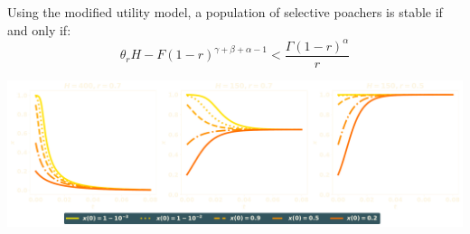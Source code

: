 \documentclass{beamer}
\begin{document}
\begin{frame}
    \centering
    \footnotesize
    \begin{theorem}[Disincentive]
    Using the modified utility model, a population of selective poachers is stable
    if and only if:
     \[\theta_r H - F (1 - r)^{\gamma + \beta + \alpha -1} < \frac{\Gamma(1 - r)^{\alpha}}{r}\]
    \end{theorem}

    \pause
    \vspace{1cm}
    \centering
    \includegraphics[width=\textwidth]{static/numeric_two.pdf}
\end{frame}

\end{document}
